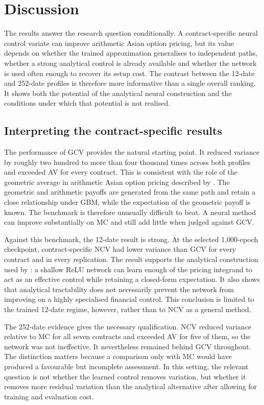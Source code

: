 \chapter{Discussion}
\label{chap:discussion}

The results answer the research question conditionally. A contract-specific neural control variate can improve arithmetic Asian option pricing, but its value depends on whether the trained approximation generalises to independent paths, whether a strong analytical control is already available and whether the network is used often enough to recover its setup cost. The contrast between the 12-date and 252-date profiles is therefore more informative than a single overall ranking. It shows both the potential of the analytical neural construction and the conditions under which that potential is not realised.

\section{Interpreting the contract-specific results}

The performance of GCV provides the natural starting point. It reduced variance by roughly two hundred to more than four thousand times across both profiles and exceeded AV for every contract. This is consistent with the role of the geometric average in arithmetic Asian option pricing described by \textcite{kemna_vorst_1990}. The geometric and arithmetic payoffs are generated from the same path and retain a close relationship under GBM, while the expectation of the geometric payoff is known. The benchmark is therefore unusually difficult to beat. A neural method can improve substantially on MC and still add little when judged against GCV.

Against this benchmark, the 12-date result is strong. At the selected 1{,}000-epoch checkpoint, contract-specific NCV had lower variance than GCV for every contract and in every replication. The result supports the analytical construction used by \textcite{el_filali_ech-chafiq_lelong_reghai_2021}: a shallow ReLU network can learn enough of the pricing integrand to act as an effective control while retaining a closed-form expectation. It also shows that analytical tractability does not necessarily prevent the network from improving on a highly specialised financial control. This conclusion is limited to the trained 12-date regime, however, rather than to NCV as a general method.

The 252-date evidence gives the necessary qualification. NCV reduced variance relative to MC for all seven contracts and exceeded AV for five of them, so the network was not ineffective. It nevertheless remained behind GCV throughout. The distinction matters because a comparison only with MC would have produced a favourable but incomplete assessment. In this setting, the relevant question is not whether the learned control removes variation, but whether it removes more residual variation than the analytical alternative after allowing for training and evaluation cost.

